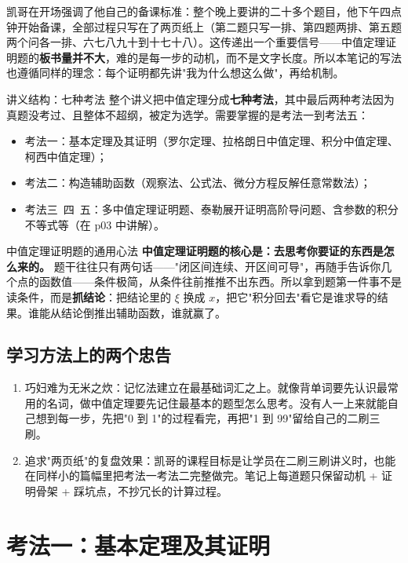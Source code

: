 \documentclass[a4paper]{article}
\begin{document}
凯哥在开场强调了他自己的备课标准：整个晚上要讲的二十多个题目，他下午四点钟开始备课，全部过程只写在了两页纸上（第二题只写一排、第四题两排、第五题两个问各一排、六七八九十到十七十八）。这传递出一个重要信号——中值定理证明题的\textbf{板书量并不大}，难的是每一步的动机，而不是文字长度。所以本笔记的写法也遵循同样的理念：每个证明都先讲"我为什么想这么做"，再给机制。

\begin{knowledgebox}{讲义结构：七种考法}
整个讲义把中值定理分成\textbf{七种考法}，其中最后两种考法因为真题没考过、且整体不超纲，被定为选学。需要掌握的是考法一到考法五：
\begin{itemize}
\item 考法一：基本定理及其证明（罗尔定理、拉格朗日中值定理、积分中值定理、柯西中值定理）；
\item 考法二：构造辅助函数（观察法、公式法、微分方程反解任意常数法）；
\item 考法三\ 四\ 五：多中值定理证明题、泰勒展开证明高阶导问题、含参数的积分不等式等（在 p03 中讲解）。
\end{itemize}
\end{knowledgebox}

\begin{importantbox}{中值定理证明题的通用心法}
\textbf{中值定理证明题的核心是：去思考你要证的东西是怎么来的。} 题干往往只有两句话——"闭区间连续、开区间可导"，再随手告诉你几个点的函数值——条件极简，从条件往前推推不出东西。所以拿到题第一件事不是读条件，而是\textbf{抓结论}：把结论里的 $\xi$ 换成 $x$，把它"积分回去"看它是谁求导的结果。谁能从结论倒推出辅助函数，谁就赢了。
\end{importantbox}

\subsection{学习方法上的两个忠告}
\begin{enumerate}
\item 巧妇难为无米之炊：记忆法建立在最基础词汇之上。就像背单词要先认识最常用的名词，做中值定理要先记住最基本的题型怎么思考。没有人一上来就能自己想到每一步，先把"0 到 1"的过程看完，再把"1 到 99"留给自己的二刷三刷。
\item 追求"两页纸"的复盘效果：凯哥的课程目标是让学员在二刷三刷讲义时，也能在同样小的篇幅里把考法一考法二完整做完。笔记上每道题只保留动机 + 证明骨架 + 踩坑点，不抄冗长的计算过程。
\end{enumerate}

\section{考法一：基本定理及其证明}
\end{document}
